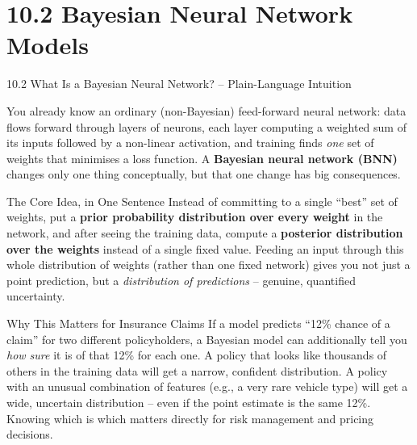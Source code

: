 \documentclass[aspectratio=169,10pt]{beamer}
\begin{document}
\section{10.2 Bayesian Neural Network Models}

\begin{frame}[allowframebreaks]{10.2 What Is a Bayesian Neural Network? -- Plain-Language Intuition}

You already know an ordinary (non-Bayesian) feed-forward neural network:
data flows forward through layers of neurons, each layer computing a weighted
sum of its inputs followed by a non-linear activation, and training finds
\emph{one} set of weights that minimises a loss function. A \textbf{Bayesian
neural network (BNN)} changes only one thing conceptually, but that one
change has big consequences.

  \begin{alertblock}{The Core Idea, in One Sentence}
    Instead of committing to a single ``best'' set of weights, put a
    \textbf{prior probability distribution over every weight} in the network,
    and after seeing the training data, compute a \textbf{posterior
    distribution over the weights} instead of a single fixed value. Feeding
    an input through this whole distribution of weights (rather than one
    fixed network) gives you not just a point prediction, but a
    \emph{distribution of predictions} -- genuine, quantified uncertainty.
  \end{alertblock}

  \begin{block}{Why This Matters for Insurance Claims}
    If a model predicts ``12\% chance of a claim'' for two different
    policyholders, a Bayesian model can additionally tell you \emph{how sure}
    it is of that 12\% for each one. A policy that looks like thousands of
    others in the training data will get a narrow, confident distribution.
    A policy with an unusual combination of features (e.g., a very rare
    vehicle type) will get a wide, uncertain distribution -- even if the
    point estimate is the same 12\%. Knowing which is which matters directly
    for risk management and pricing decisions.
  \end{block}

  \framebreak


\end{frame}
\end{document}

